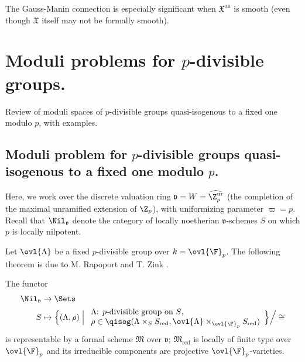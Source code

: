 \begin{para}
 The Gauss-Manin connection is especially significant when
 ${\mathfrak{X}}^{\mathrm{an}}$ is smooth (even though $\mathfrak{X}$
 itself may not be formally smooth).

\newpage
\section{Moduli problems for $p$-divisible groups.}\label{sec:4}

\begin{abst}
 Review of moduli spaces of $p$-divisible groups quasi-isogenous to a
 fixed one modulo $p$, with examples.
\end{abst}
\end{para}


\subsection{Moduli problem for $p$-divisible groups quasi-isogenous to a
 fixed one modulo $p$.}\label{sub:4.1}

\begin{para}\label{para:4.1.1} Here, we work over the discrete valuation
 ring $\mathfrak{v}=W= {\widehat{\Z_p^{\mathrm{ur}}}}$ (the completion of the
maximal unramified extension of $\Z_p$), with uniformizing parameter
$\varpi=p$. Recall that $\Nil_\mathfrak{v}$ denote the category of
locally noetherian $\mathfrak{v}$-schemes $S$ on which $p$ is locally
nilpotent.


Let $\ovl{\Lambda}$ be a fixed $p$-divisible group over
$k={\ovl{\F}}_p$. The following theorem is due to M.  Rapoport and
T. Zink \cite[2.16, 2.32]{psfpg}.
\end{para}

\begin{thm}\label{thm:4.1.2} The functor
\begin{align*}
 \Nil_\mathfrak{v}&\rightarrow \Sets\\
 S&\mapsto \Bigl\{(\Lambda,\rho)\Bigm|
 \begin{array}{l}
  \Lambda \text{: $p$-divisible group on $S$},\\
  \rho\in \qisog(\Lambda\times_S S_{\mathrm{red}},
 \ovl{\Lambda}\times_{{\ovl{\F}}_p}S_{\mathrm{red}})
 \end{array}
 \Bigr\}\Big/\cong
\end{align*}
is representable by a formal scheme $\mathfrak{M}$
over $\mathfrak{v}$; $\mathfrak{M}_{\mathrm{red}}$ is locally of
finite type over ${\ovl{\F}}_p$ and its irreducible components are
projective ${\ovl{\F}}_p$-varieties.
\end{thm}

